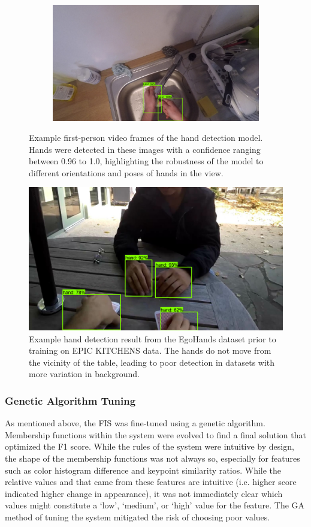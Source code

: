 \documentclass[12pt]{report}
\begin{document}
\begin{figure}[t]
\begin{subfigure}{.5\textwidth}
\label{handsC}
\end{subfigure}
\begin{subfigure}{.5\textwidth}
\centerline{\includegraphics[width=.95\linewidth]{figure/handEval4.png}}
\label{handsD}
\end{subfigure}
\caption{Example first-person video frames of the hand detection model. Hands were detected in these images with a confidence ranging between 0.96 to 1.0, highlighting the robustness of the model to different orientations and poses of hands in the view.}
\label{sampleHands}
\end{figure}

\begin{figure}[t]
\centerline{\includegraphics[width=.65\linewidth]{figure/egoHands1.png}}
\caption{Example hand detection result from the EgoHands dataset prior to training on EPIC KITCHENS data. The hands do not move from the vicinity of the table, leading to poor detection in datasets with more variation in background.}
\label{sampleEgoHands}
\end{figure}

\subsubsection{Genetic Algorithm Tuning}
As mentioned above, the FIS was fine-tuned using a genetic algorithm. Membership functions within the system were evolved to find a final solution that optimized the F1 score. While the rules of the system were intuitive by design, the shape of the membership functions was not always so, especially for features such as color histogram difference and keypoint similarity ratios. While the relative values and that came from these features are intuitive (i.e. higher score indicated higher change in appearance), it was not immediately clear which values might constitute a `low', `medium', or `high' value for the feature. The GA method of tuning the system mitigated the risk of choosing poor values.
\end{document}
